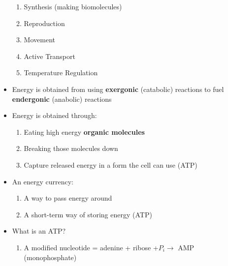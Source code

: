 \documentclass[12pt]{article}
\begin{document}
\begin{itemize}
    \begin{enumerate}

      \item Synthesis (making biomolecules)

      \item Reproduction

      \item Movement

      \item Active Transport

      \item Temperature Regulation

    \end{enumerate}

  \item Energy is obtained from using \textbf{exergonic} (catabolic) reactions to fuel \textbf{endergonic} (anabolic) reactions

  \item Energy is obtained through:

    \begin{enumerate}

      \item Eating high energy \textbf{organic molecules}
        
      \item Breaking those molecules down

      \item Capture released energy in a form the cell can use (ATP)

    \end{enumerate}

  \item An energy currency:

    \begin{enumerate}

      \item A way to pass energy around

      \item A short-term way of storing energy (ATP)

    \end{enumerate}

  \item What is an ATP?

    \begin{enumerate}

      \item A modified nucleotide = adenine + ribose +$P_i \to$ AMP (monophosphate)


\end{enumerate}
\end{itemize}
\end{document}
